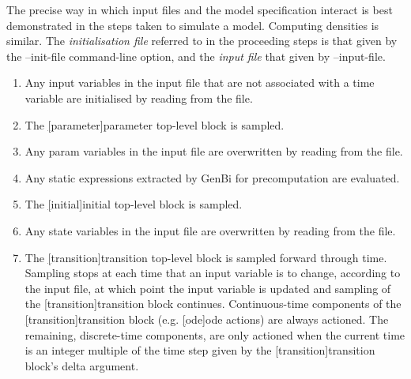 The precise way in which input files and the model specification interact is
best demonstrated in the steps taken to simulate a model. Computing densities
is similar. The \emph{initialisation file} referred to in the proceeding steps
is that given by the {\sf --init-file} command-line option, and the
\emph{input file} that given by {\sf --input-file}.
\begin{enumerate}
\item Any {\sf input} variables in the input file that are not associated with
  a time variable are initialised by reading from the file.
\item The \hyperref[hyper][parameter]{\sf parameter}
  top-level block is sampled.
\item Any {\sf param} variables in the input file are overwritten by reading
  from the file.
\item Any static expressions extracted by GenBi for precomputation are
  evaluated.
\item The \hyperref[hyper][initial]{\sf initial} top-level
  block is sampled.
\item Any {\sf state} variables in the input file are overwritten by reading
  from the file.
\item The \hyperref[hyper][transition]{\sf transition}
  top-level block is sampled forward through time. Sampling stops at each time
  that an {\sf input} variable is to change, according to the input file, at
  which point the {\sf input} variable is updated and sampling of the
  \hyperref[hyper][transition]{\sf transition} block
  continues. Continuous-time components of the
  \hyperref[hyper][transition]{\sf transition} block
  (e.g. \hyperref[hyper][ode]{\sf ode} actions) are always
  actioned. The remaining, discrete-time components, are
  only actioned when the current time is an integer multiple of the time step
  given by the \hyperref[hyper][transition]{\sf transition}
  block's {\sf delta} argument.
\end{enumerate}

